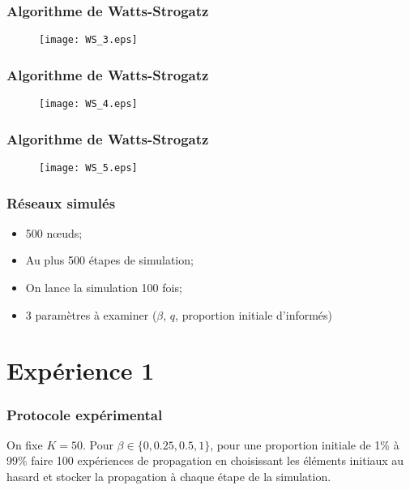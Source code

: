 \documentclass{beamer}
\begin{document}
\begin{frame}
  \frametitle{Algorithme de Watts-Strogatz}
  \begin{figure}[H]
    \texttt{[image: WS\_3.eps]}
  \end{figure}
\end{frame}

\begin{frame}
  \frametitle{Algorithme de Watts-Strogatz}
  \begin{figure}[H]
    \texttt{[image: WS\_4.eps]}
  \end{figure}
\end{frame}

\begin{frame}
  \frametitle{Algorithme de Watts-Strogatz}
  \begin{figure}[H]
    \texttt{[image: WS\_5.eps]}
  \end{figure}
\end{frame}

\begin{frame}
  \frametitle{Réseaux simulés}
  \begin{itemize}
    \item<1-> 500 nœuds;
    \item<2-> Au plus 500 étapes de simulation;
    \item<3-> On lance la simulation 100 fois;
    \item<4-> 3 paramètres à examiner ($\beta$, $q$, proportion initiale d'informés)
  \end{itemize}
\end{frame}

\section{Expérience 1}
\begin{frame}
  \frametitle{Protocole expérimental}
  On fixe $K=50$.
  Pour $\beta \in \{0,0.25,0.5,1\}$, pour une proportion initiale de 1\% à 99\% faire 100 expériences de propagation en choisissant les éléments initiaux au hasard et stocker la propagation à chaque étape de la simulation.

\end{frame}
\end{document}

